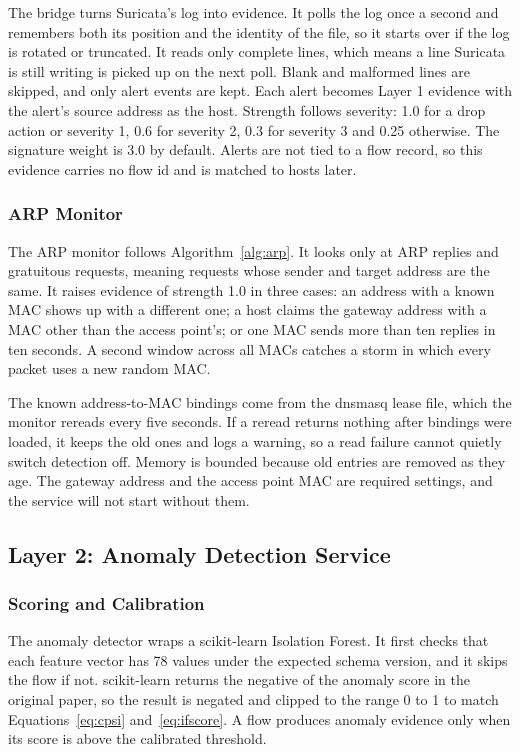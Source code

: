 \noindent The bridge turns Suricata's log into evidence. It polls the log once a second and remembers both its position and the identity of the file, so it starts over if the log is rotated or truncated. It reads only complete lines, which means a line Suricata is still writing is picked up on the next poll. Blank and malformed lines are skipped, and only alert events are kept. Each alert becomes Layer 1 evidence with the alert's source address as the host. Strength follows severity: 1.0 for a drop action or severity 1, 0.6 for severity 2, 0.3 for severity 3 and 0.25 otherwise. The signature weight is 3.0 by default. Alerts are not tied to a flow record, so this evidence carries no flow id and is matched to hosts later.

\subsubsection{ARP Monitor}\label{sec:7.1.6.3}

\noindent The ARP monitor follows Algorithm~\ref{alg:arp}. It looks only at ARP replies and gratuitous requests, meaning requests whose sender and target address are the same. It raises evidence of strength 1.0 in three cases: an address with a known MAC shows up with a different one; a host claims the gateway address with a MAC other than the access point's; or one MAC sends more than ten replies in ten seconds. A second window across all MACs catches a storm in which every packet uses a new random MAC.

\noindent The known address-to-MAC bindings come from the dnsmasq lease file, which the monitor rereads every five seconds. If a reread returns nothing after bindings were loaded, it keeps the old ones and logs a warning, so a read failure cannot quietly switch detection off. Memory is bounded because old entries are removed as they age. The gateway address and the access point MAC are required settings, and the service will not start without them.

\subsection{Layer 2: Anomaly Detection Service}\label{sec:7.1.7}

\subsubsection{Scoring and Calibration}\label{sec:7.1.7.1}

\noindent The anomaly detector wraps a scikit-learn Isolation Forest. It first checks that each feature vector has 78 values under the expected schema version, and it skips the flow if not. scikit-learn returns the negative of the anomaly score in the original paper, so the result is negated and clipped to the range 0 to 1 to match Equations~\ref{eq:cpsi} and~\ref{eq:ifscore}. A flow produces anomaly evidence only when its score is above the calibrated threshold.


